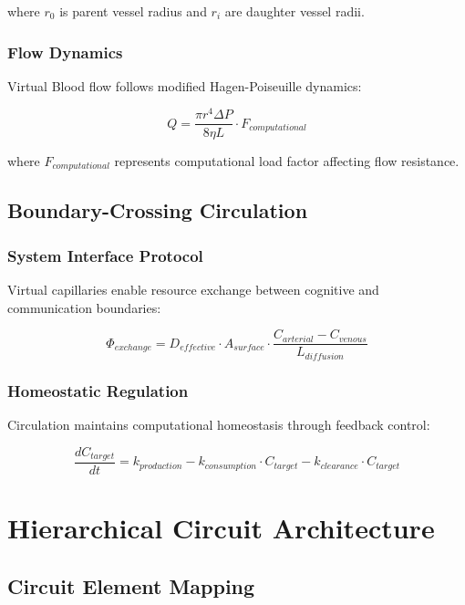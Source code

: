 \documentclass[12pt,a4paper]{article}
\begin{document}
where $r_0$ is parent vessel radius and $r_i$ are daughter vessel radii.

\subsubsection{Flow Dynamics}

Virtual Blood flow follows modified Hagen-Poiseuille dynamics:

\begin{equation}
Q = \frac{\pi r^4 \Delta P}{8 \eta L} \cdot F_{computational}
\end{equation}

where $F_{computational}$ represents computational load factor affecting flow resistance.

\subsection{Boundary-Crossing Circulation}

\subsubsection{System Interface Protocol}

Virtual capillaries enable resource exchange between cognitive and communication boundaries:

\begin{equation}
\Phi_{exchange} = D_{effective} \cdot A_{surface} \cdot \frac{C_{arterial} - C_{venous}}{L_{diffusion}}
\end{equation}

\subsubsection{Homeostatic Regulation}

Circulation maintains computational homeostasis through feedback control:

\begin{equation}
\frac{dC_{target}}{dt} = k_{production} - k_{consumption} \cdot C_{target} - k_{clearance} \cdot C_{target}
\end{equation}

\section{Hierarchical Circuit Architecture}

\subsection{Circuit Element Mapping}
\end{document}

